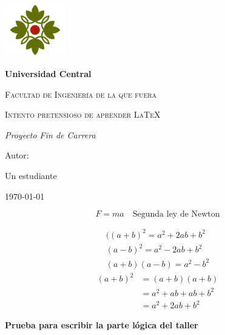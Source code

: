 \documentclass{article}
\begin{document}
\begin{titlepage}
	\centering
	{\includegraphics[width=0.2\textwidth]{../../pictures/uc.png}\par}
	\vspace{1cm}
	{\bfseries\LARGE Universidad Central\par}
	\vspace{1cm}
	{\scshape\Large Facultad de Ingenier\'ia de la que fuera \par}
	\vspace{3cm}
	{\scshape\Huge Intento pretensioso de aprender \LaTeX \par}
	\vspace{3cm}
	{\itshape\Large Proyecto Fin de Carrera \par}
	\vfill
	{\Large Autor: \par}
	{\Large Un estudiante \par}
	\vfill
	{\Large \today \par}
\end{titlepage}

\begin{equation*}
	F = ma \quad\text{Segunda ley de Newton} %
\end{equation*}

\begin{align*}
	((a+b)^2 = a^2 + 2ab + b^2 \\
	(a-b)^2 = a^2 - 2ab + b^2  \\
	(a+b)(a-b) = a^2 - b^2
\end{align*}
\begin{equation*}
	\begin{split}
		(a+b)^2& = (a+b)(a+b)\\
		& = a^2 + ab + ab + b^2\\
		& = a^2 + 2ab + b^2
	\end{split}
\end{equation*}


{\bfseries\LARGE Prueba para escribir la parte lógica del taller \par}
\end{document}

